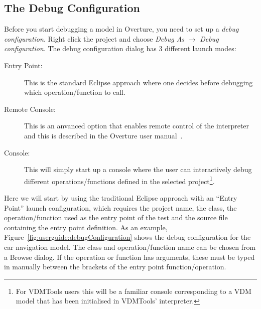 \subsection{The Debug Configuration}\label{sec:debugconfig}

Before you start debugging a model in Overture, you need to set up a
\emph{debug configuration}. Right click the project and choose
\emph{Debug As} $ \rightarrow $ \emph{Debug configuration}.
The debug configuration
dialog has 3 different launch modes:

\begin{description}
\item[Entry Point:] This is the standard Eclipse approach where one
  decides before debugging which operation/function to call.
\item[Remote Console:] This is an anvanced option that enables remote
  control of the interpreter and this is described in the Overture
  user manual~\cite{Larsen&10d}.
\item[Console:] This will simply start up a console where the user can
  interactively debug different operations/functions defined in the
  selected project\footnote{For VDMTools users this will be a familiar
    console corresponding to a VDM model that has been initialised in
    VDMTools' interpreter.}.
\end{description}

Here we will start by using 
the traditional Eclipse approach with an ``Entry Point'' launch
configuration, which 
requires the project name, the class, the operation/function used as
the entry point of the test and the source file containing the entry
point definition.  As an example,
Figure~\ref{fig:userguide:debugConfiguration} shows the debug
configuration for the car navigation model. The class and
operation/function name can be chosen from a Browse dialog. If the
operation or function has arguments, these must be typed in manually
between the brackets of the entry point function/operation.

